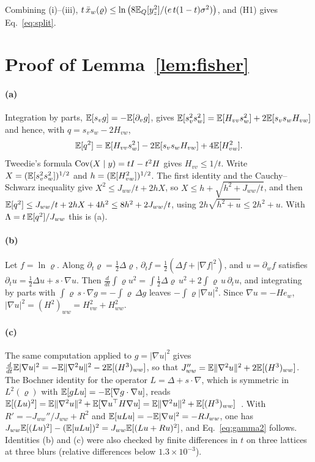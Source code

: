 Combining (i)--(iii), $t\,\bar{x}_w(\varrho) \leq \ln\big(8\mathbb{E}_Q[y_z^2]/(e\,t(1-t)\sigma^2)\big)$, and (H1) gives Eq.~\eqref{eq:split}.

\section{Proof of Lemma~\ref{lem:fisher}}
\label{app:fisher}

\paragraph*{(a)} Integration by parts, $\mathbb{E}[s_v g] = -\mathbb{E}[\partial_v g]$, gives $\mathbb{E}[s_v^2s_w^2] = \mathbb{E}[H_{vv}s_w^2] + 2\mathbb{E}[s_vs_wH_{vw}]$ and hence, with $q = s_vs_w - 2H_{vw}$,
\begin{equation}
\mathbb{E}[q^2] = \mathbb{E}[H_{vv}s_w^2] - 2\mathbb{E}[s_vs_wH_{vw}] + 4\mathbb{E}[H_{vw}^2].
\end{equation}
Tweedie's formula $\operatorname{Cov}(X\mid y) = tI - t^2H$ gives $H_{vv} \leq 1/t$. Write $X = (\mathbb{E}[s_v^2s_w^2])^{1/2}$ and $h = (\mathbb{E}[H_{vw}^2])^{1/2}$. The first identity and the Cauchy--Schwarz inequality give $X^2 \leq J_{ww}/t + 2hX$, so $X \leq h + \sqrt{h^2 + J_{ww}/t}$, and then $\mathbb{E}[q^2] \leq J_{ww}/t + 2hX + 4h^2 \leq 8h^2 + 2J_{ww}/t$, using $2h\sqrt{h^2 + u} \leq 2h^2 + u$. With $\Lambda = t\,\mathbb{E}[q^2]/J_{ww}$ this is (a).

\paragraph*{(b)} Let $f = \ln\varrho$. Along $\partial_t\varrho = \frac12\Delta\varrho$, $\partial_t f = \frac12(\Delta f + |\nabla f|^2)$, and $u = \partial_w f$ satisfies $\partial_t u = \frac12\Delta u + s\cdot\nabla u$. Then $\frac{d}{dt}\int\varrho u^2 = \int\frac12\Delta\varrho\,u^2 + 2\int\varrho\,u\,\partial_t u$, and integrating by parts with $\int\varrho\,s\cdot\nabla g = -\int\varrho\,\Delta g$ leaves $-\int\varrho|\nabla u|^2$. Since $\nabla u = -He_w$, $|\nabla u|^2 = (H^2)_{ww} = H_{vw}^2 + H_{ww}^2$.

\paragraph*{(c)} The same computation applied to $g = |\nabla u|^2$ gives $\frac{d}{dt}\mathbb{E}|\nabla u|^2 = -\mathbb{E}\|\nabla^2u\|^2 - 2\mathbb{E}[(H^3)_{ww}]$, so that $J_{ww}'' = \mathbb{E}\|\nabla^2u\|^2 + 2\mathbb{E}[(H^3)_{ww}]$. The Bochner identity for the operator $L = \Delta + s\cdot\nabla$, which is symmetric in $L^2(\varrho)$ with $\mathbb{E}[gLu] = -\mathbb{E}[\nabla g\cdot\nabla u]$, reads $\mathbb{E}[(Lu)^2] = \mathbb{E}\|\nabla^2u\|^2 + \mathbb{E}[\nabla u^\top H\nabla u] = \mathbb{E}\|\nabla^2 u\|^2 + \mathbb{E}[(H^3)_{ww}]$~\cite{bakry2014}. With $R' = -J_{ww}''/J_{ww} + R^2$ and $\mathbb{E}[uLu] = -\mathbb{E}|\nabla u|^2 = -RJ_{ww}$, one has $J_{ww}\mathbb{E}[(Lu)^2] - (\mathbb{E}[uLu])^2 = J_{ww}\mathbb{E}[(Lu + Ru)^2]$, and Eq.~\eqref{eq:gamma2} follows. Identities (b) and (c) were also checked by finite differences in $t$ on three lattices at three blurs (relative differences below $1.3\times 10^{-3}$).

